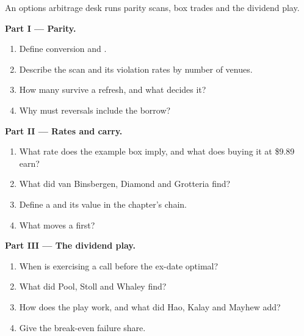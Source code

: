 \begin{problem}\label{pb:hf:options-cross-venue-and-volatility-arbitrage-at-speed:1}
An options arbitrage desk runs parity scans, box trades and the dividend play.

\medskip\noindent\textbf{Part I --- Parity.}
\begin{enumerate}
\item Define conversion and .
\item Describe the scan and its violation rates by number of venues.
\item How many survive a refresh, and what decides it?
\item Why must reversals include the borrow?
\end{enumerate}

\medskip\noindent\textbf{Part II --- Rates and carry.}
\begin{enumerate}[resume]
\item What rate does the example box imply, and what does buying it at \$9.89 earn?
\item What did van Binsbergen, Diamond and Grotteria find?
\item Define a  and its value in the chapter's chain.
\item What moves a  first?
\end{enumerate}

\medskip\noindent\textbf{Part III --- The dividend play.}
\begin{enumerate}[resume]
\item When is exercising a call before the ex-date optimal?
\item What did Pool, Stoll and Whaley find?
\item How does the play work, and what did Hao, Kalay and Mayhew add?
\item Give the break-even failure share.
\end{enumerate}


\end{problem}
